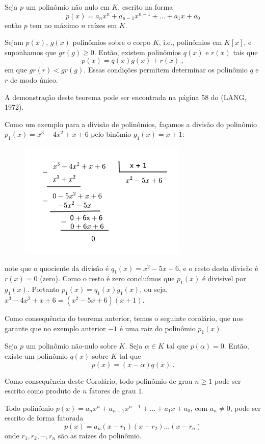 \begin{teo}
  Seja $p$ um polinômio não nulo em $K$, escrito na forma
  \[p(x)= a_nx^n + a_{n-1}x^{n-1}+ \ldots + a_1x+ a_0\]
   então $p$ tem no máximo $n$ raízes em $K$.
 \end{teo}

 \begin{teo}
  Sejam $p(x)$, $g(x)$ polinômios sobre o corpo $K$, i.e., polinômios em $K[x]$, e suponhamos que $gr(g) \geq 0$. Então, existem polinômios $q(x)$ e $r(x)$ tais que
  \[p(x)= q(x)g(x) + r(x) \ , \]
  em que $gr(r) < gr (g)$. Essas condições permitem determinar os polinômio $q$ e $r$ de modo único.
 \end{teo}

 \begin{dem}
 A demonstração deste teorema pode ser encontrada na página 58 do (LANG, 1972).
 \end{dem}



 \begin{exem}
  Como um exemplo para a divisão de polinômios, façamos a divisão do polinômio $p_1(x)=x^3-4x^2+x+6$ pelo binômio $g_1(x)=x+1$:

 \begin{figure}[H]
 \centering
 \includegraphics[width=8cm]{Capitulos/Figuras/polinomiosdivisao.pdf}
 \end{figure}

 note que o quociente da divisão é $q_1(x)= x^2 - 5x + 6$, e o resto desta divisão é $r(x)=0$ (zero). Como o resto é zero concluímos que $p_1(x)$ é divisível por $g_1(x)$. Portanto $p_1(x)= q_1(x)g_1(x)$, ou seja, $x^3-4x^2+x+6= (x^2-5x+6)(x+1)$.
 \end{exem}

 Como consequência do teorema anterior, temos o seguinte corolário, que nos garante que no exemplo anterior $-1$ é uma raiz do polinômio $p_1(x)$.

 \begin{cor}
 Seja $p$ um polinômio não-nulo sobre $K$. Seja $\alpha \in K$ tal que $p(\alpha)=0$. Então, existe um polinômio $q(x)$ sobre $K$ tal que
 \[p(x)= (x - \alpha)q(x) \ .\]
 \end{cor}

 Como consequência deste Corolário, todo polinômio de grau $n \geq 1$ pode ser escrito como produto de $n$ fatores de grau $1$.

 \begin{teo}
  Todo polinômio $p(x)= a_nx^n + a_{n-1}x^{n-1}+ \ldots + a_1x+ a_0$, com $a_n \neq 0$, pode ser escrito de forma fatorada
  \[p(x)= a_n(x - r_1)(x - r_2) \ldots (x - r_n)\]
  onde $r_1, r_2, \cdots, r_n$ são as raízes do polinômio.
 \end{teo}
